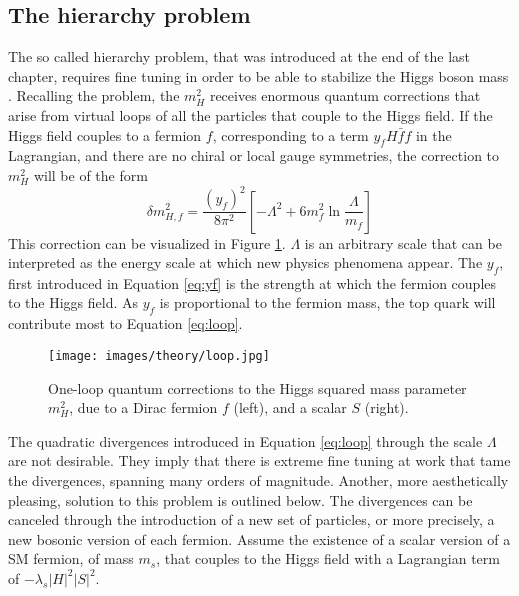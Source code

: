\subsection*{The hierarchy problem}
\noindent\justify
The so called hierarchy problem, that was introduced at the end of the last chapter, requires fine tuning in order to be able to stabilize the Higgs boson mass \cite{Martin:1997ns}. 
Recalling the problem, the $m_{H}^{2}$ receives enormous quantum corrections that arise from virtual loops of all the particles that couple to the Higgs field. 
If the Higgs field couples to a fermion $f$, corresponding to a term $y_{f}H\bar{f}f$ in the Lagrangian, and there are no chiral or local gauge symmetries, the correction to $m_{H}^{2}$ will be of the form
\begin{equation}
\delta m_{H,f}^{2}=\frac{(y_{f})^{2}}{8\pi^{2}}\left[-\Lambda^{2} +6m_{f}^{2}\ln\frac{\Lambda}{m_{f}}\right]
\label{eq:loop}
\end{equation}                                                                                                
This correction can be visualized in Figure \ref{fig:loop}.
$\Lambda$ is an arbitrary scale that can be interpreted as the energy scale at which new physics phenomena appear. 
The $y_{f}$, first introduced in Equation \ref{eq:yf} is the strength at which the fermion couples to the Higgs field. 
As $y_{f}$ is proportional to the fermion mass, the top quark will contribute most to Equation \ref{eq:loop}.
\begin{figure}[htbp!]
\begin{center}
    \texttt{[image: images/theory/loop.jpg]}
\caption{One-loop quantum corrections to the Higgs squared mass parameter $m_H^2$, due to a Dirac fermion $f$ (left), and a scalar $S$ (right).}
\label{fig:loop}
\end{center}
\end{figure}                                     
The quadratic divergences introduced in Equation \ref{eq:loop} through the scale $\Lambda$ are not desirable. 
They imply that there is extreme fine tuning at work that tame the divergences, spanning many orders of magnitude.
Another, more aesthetically pleasing, solution to this problem is outlined below.    
The divergences can be canceled through the introduction of a new set of particles, or more precisely, a new bosonic version of each fermion. 
Assume the existence of a scalar version of a SM fermion, of mass $m_{s}$, that couples to the Higgs field with a Lagrangian term of $-\lambda_{s}|H|^{2}|S|^{2}$. 
